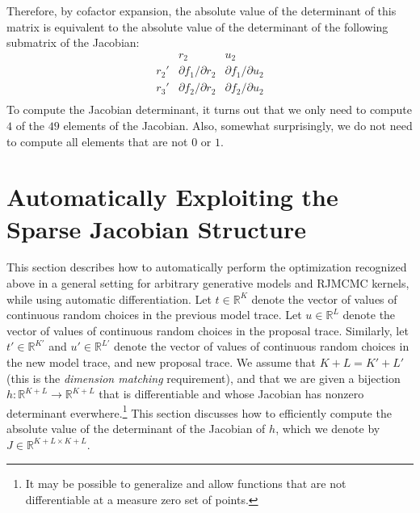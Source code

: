 \documentclass{article}
\begin{document}
Therefore, by cofactor expansion, the absolute value of the determinant of this matrix is equivalent to the absolute value of the determinant of the following submatrix of the Jacobian:
\[
\begin{array}{c|ccccccc}
&       r_2 &   u_2 \\
\hline
r_2'  & {\scriptstyle \partial f_1 / \partial r_2}   &   {\scriptstyle \partial f_1 / \partial u_2}   \\
r_3'  & {\scriptstyle \partial f_2 / \partial r_2}   &   {\scriptstyle \partial f_2 / \partial u_2}   \\
\end{array}
\]
To compute the Jacobian determinant, it turns out that we only need to compute $4$ of the $49$ elements of the Jacobian.
Also, somewhat surprisingly, we do not need to compute all elements that are not $0$ or $1$.

\section{Automatically Exploiting the Sparse Jacobian Structure}

This section describes how to automatically perform the optimization recognized above in a general setting for arbitrary generative models and RJMCMC kernels, while using automatic differentiation.
Let $t \in \mathbb{R}^K$ denote the vector of values of continuous random choices in the previous model trace.
Let $u \in \mathbb{R}^L$ denote the vector of values of continuous random choices in the proposal trace.
Similarly, let $t' \in \mathbb{R}^{K'}$ and $u' \in \mathbb{R}^{L'}$ denote the vector of values of continuous random choices in the new model trace, and new proposal trace.
We assume that $K + L = K' + L'$ (this is the \emph{dimension matching} requirement), and that we are given a bijection $h : \mathbb{R}^{K + L} \to \mathbb{R}^{K + L}$ that is differentiable and whose Jacobian has nonzero determinant everwhere.\footnote{It may be possible to generalize and allow functions that are not differentiable at a measure zero set of points.}
This section discusses how to efficiently compute the absolute value of the determinant of the Jacobian of $h$, which we denote by $J \in \mathbb{R}^{K + L \times K + L}$.
\end{document}
